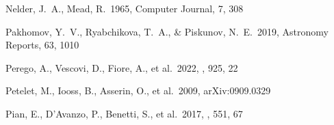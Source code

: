 \documentclass[twocolumn,twocolappendix]{aastex63}
\begin{document}
\begin{thebibliography}{}










 Nelder, J.~A., Mead, R.\ 1965, Computer Journal, 7, 308





 Pakhomov, Y.~V., Ryabchikova, T.~A., \& Piskunov, N.~E.\ 2019, Astronomy Reports, 63, 1010






 Perego, A., Vescovi, D., Fiore, A., et al.\ 2022, \apj, 925, 22


 Petelet, M., Iooss, B., Asserin, O., et al.\ 2009, arXiv:0909.0329


 Pian, E., D'Avanzo, P., Benetti, S., et al.\ 2017, \nat, 551, 67






\end{thebibliography}
\end{document}
